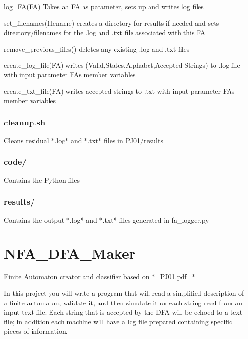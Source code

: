 \begin{DoxyItemize}
\item {\ttfamily log\+\_\+\+F\+A(\+F\+A)} Takes an FA as parameter, sets up and writes log files
\begin{DoxyItemize}
\item {\ttfamily set\+\_\+filenames(filename)} creates a directory for results if needed and sets directory/filenames for the .log and .txt file associated with this FA
\item {\ttfamily remove\+\_\+previous\+\_\+files()} deletes any existing .log and .txt files
\item {\ttfamily create\+\_\+log\+\_\+file(\+F\+A)} writes (Valid,States,Alphabet,Accepted Strings) to .log file with input parameter FA\textquotesingle{}s member variables
\item {\ttfamily create\+\_\+txt\+\_\+file(\+F\+A)} writes accepted strings to .txt with input parameter FA\textquotesingle{}s member variables
\end{DoxyItemize}
\end{DoxyItemize}

\subsubsection*{cleanup.\+sh}

Cleans residual $\ast$.log$\ast$ and $\ast$.txt$\ast$ files in P\+J01/results

\subsubsection*{code/}

Contains the Python files

\subsubsection*{results/}

Contains the output $\ast$.log$\ast$ and $\ast$.txt$\ast$ files generated in fa\+\_\+logger.\+py

\section*{N\+F\+A\+\_\+\+D\+F\+A\+\_\+\+Maker}

Finite Automaton creator and classifier based on $\ast$\+\_\+\+P\+J01.pdf\+\_\+$\ast$

In this project you will write a program that will read a simplified description of a finite automaton, validate it, and then simulate it on each string read from an input text file. Each string that is accepted by the D\+FA will be echoed to a text file; in addition each machine will have a log file prepared containing specific pieces of information.

